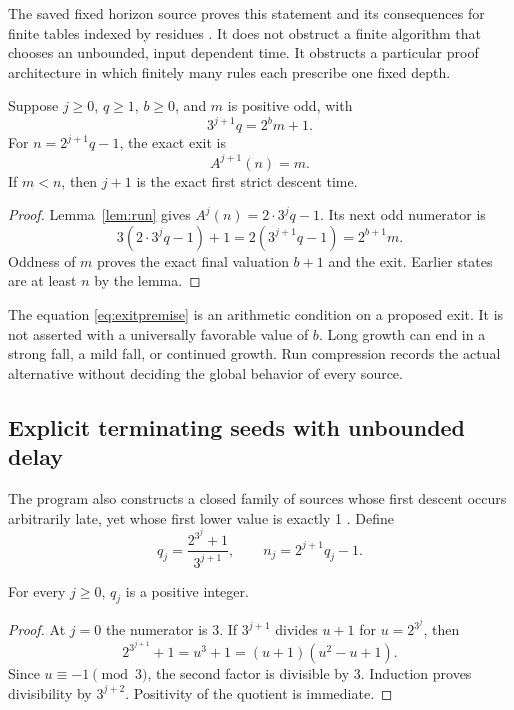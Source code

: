 The saved fixed horizon source proves this statement and its consequences for finite tables indexed by residues \cite{projectcollatzhorizon}. It does not obstruct a finite algorithm that chooses an unbounded, input dependent time. It obstructs a particular proof architecture in which finitely many rules each prescribe one fixed depth.

\begin{theorem}\label{thm:exit}
Suppose $j\ge0$, $q\ge1$, $b\ge0$, and $m$ is positive odd, with
\begin{equation}\label{eq:exitpremise}
3^{j+1}q=2^b m+1.
\end{equation}
For $n=2^{j+1}q-1$, the exact exit is
\begin{equation}\label{eq:exit}
A^{j+1}(n)=m.
\end{equation}
If $m<n$, then $j+1$ is the exact first strict descent time.
\end{theorem}
\begin{proof}
Lemma~\ref{lem:run} gives $A^j(n)=2\cdot3^j q-1$. Its next odd numerator is
\[
3(2\cdot3^j q-1)+1=2(3^{j+1}q-1)=2^{b+1}m.
\]
Oddness of $m$ proves the exact final valuation $b+1$ and the exit. Earlier states are at least $n$ by the lemma.
\end{proof}

The equation \eqref{eq:exitpremise} is an arithmetic condition on a proposed exit. It is not asserted with a universally favorable value of $b$. Long growth can end in a strong fall, a mild fall, or continued growth. Run compression records the actual alternative without deciding the global behavior of every source.

\subsection{Explicit terminating seeds with unbounded delay}
The program also constructs a closed family of sources whose first descent occurs arbitrarily late, yet whose first lower value is exactly 1 \cite{projectcollatzseeds}. Define
\begin{equation}\label{eq:seeds}
q_j=\frac{2^{3^j}+1}{3^{j+1}},\qquad n_j=2^{j+1}q_j-1.
\end{equation}

\begin{lemma}\label{lem:seeddiv}
For every $j\ge0$, $q_j$ is a positive integer.
\end{lemma}
\begin{proof}
At $j=0$ the numerator is 3. If $3^{j+1}$ divides $u+1$ for $u=2^{3^j}$, then
\[
2^{3^{j+1}}+1=u^3+1=(u+1)(u^2-u+1).
\]
Since $u\equiv-1\pmod3$, the second factor is divisible by 3. Induction proves divisibility by $3^{j+2}$. Positivity of the quotient is immediate.
\end{proof}

